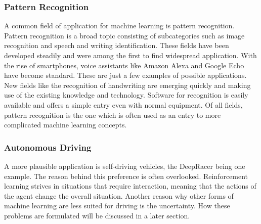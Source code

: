 \subsubsection{Pattern Recognition}
A common field of application for machine learning is pattern recognition. Pattern recognition is a broad topic consisting of subcategories such as image recognition and speech and writing identification. These fields have been developed steadily and were among the first to find widespread application. With the rise of smartphones, voice assistants like Amazon Alexa and Google Echo have become standard. These are just a few examples of possible applications. New fields like the recognition of handwriting are emerging quickly and making use of the existing knowledge and technology. Software for recognition is easily available and offers a simple entry even with normal equipment. Of all fields, pattern recognition is the one which is often used as an entry to more complicated machine learning concepts.

\subsubsection{Autonomous Driving}
A more plausible application is self-driving vehicles, the DeepRacer being one example. The reason behind this preference is often overlooked. Reinforcement learning strives in situations that require interaction, meaning that the actions of the agent change the overall situation. Another reason why  other forms of machine learning are less suited for driving is the uncertainty. How these problems are formulated will be discussed in a later section.


